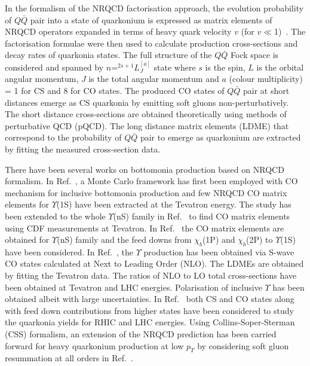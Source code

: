 \documentclass[review]{elsarticle}
\begin{document}
In the formalism of the NRQCD factorisation approach, the evolution probability of $Q\bar{Q}$
pair into a state of quarkonium is expressed as matrix elements of NRQCD operators expanded
in terms of heavy quark velocity $v$ (for $v\ll$1)~\cite{Bodwin:1994jh}.
The factorisation formulae were then used to calculate production cross-sections
and decay rates of quarkonia states.
The full structure of the $Q\bar{Q}$ Fock space
is considered and spanned by $n$=$^{2s+1}L_J^{[a]}$ state where $s$
is the spin, $L$ is the orbital angular momentum, $J$ is the total angular momentum
and $a$ (colour multiplicity) = 1 for CS and 8 for CO states. 
The produced CO states of $Q\bar{Q}$ pair at short distances emerge as 
CS quarkonia by emitting soft gluons non-perturbatively.
The short distance cross-sections are obtained theoretically
using methods of perturbative QCD (pQCD). The long distance matrix elements
(LDME) that correspond to the probability of 
$Q\bar{Q}$ pair to emerge as quarkonium are extracted by fitting the measured cross-section
data.

There have been several works on bottomonia production based on
NRQCD formalism. In Ref.~\cite{Domenech:1999qg}, a Monte Carlo framework has first
been employed with CO mechanism for inclusive bottomonia production and few
NRQCD CO matrix elements for $\Upsilon$(1S) have been extracted at the Tevatron energy. 
The study has been extended to the whole $\Upsilon$(nS) family in Ref.~\cite{Domenech:2000ri}
to find CO matrix elements using CDF measurements at Tevatron.
In Ref.~\cite{Brateen:PRD2001} the CO matrix elements are obtained for $\Upsilon$(nS) family
and the feed downs from $\chi_{b}$(1P) and $\chi_{b}$(2P) to $\Upsilon$(1S) have been 
considered.
In Ref.~\cite{Gong:2010bk}, the $\Upsilon$ production has been obtained via
S-wave CO states calculated at Next to Leading Order (NLO). The LDMEs are obtained
by fitting the Tevatron data. The ratios of NLO to LO total cross-sections
have been obtained at Tevatron and LHC energies. Polarisation of inclusive
$\Upsilon$ has been obtained albeit with large uncertainties.
In Ref.~\cite{Sharma:2012dy} both CS and CO states along with
feed down contributions from higher states have been considered to study the
quarkonia yields for RHIC and LHC energies.
Using Collins-Soper-Sterman (CSS) formalism, an extension of the NRQCD prediction
has been carried forward for heavy quarkonium production
at low $p_T$ by considering soft gluon resummation at all orders in Ref.~\cite{Sun:2012vc}.
\end{document}

